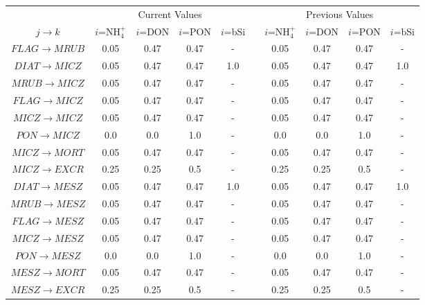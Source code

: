    \small
   \centering
   \begin{tabular}{ccccclcccc}\toprule
      & \multicolumn{4}{c}{Current Values} & \phantom{i} & \multicolumn{4}{c}{Previous Values} \\ \cmidrule{2-5} \cmidrule{7-10}
    $j\rightarrow k$ & $i$=NH$_4^+$ & $i$=DON & $i$=PON & $i$=bSi & & $i$=NH$_4^+$ & $i$=DON & $i$=PON & $i$=bSi \\ \midrule
     $FLAG\rightarrow MRUB$ & 0.05 & 0.47 & 0.47 & - & & 0.05 & 0.47 & 0.47 & - \\
     $DIAT\rightarrow MICZ$ & 0.05 & 0.47 & 0.47 & 1.0 & & 0.05 & 0.47 & 0.47 & 1.0 \\
     $MRUB\rightarrow MICZ$ & 0.05 & 0.47 & 0.47 & - & & 0.05 & 0.47 & 0.47 & - \\
     $FLAG\rightarrow MICZ$ & 0.05 & 0.47 & 0.47 & - & & 0.05 & 0.47 & 0.47 & - \\
     $MICZ\rightarrow MICZ$ & 0.05 & 0.47 & 0.47 & - & & 0.05 & 0.47 & 0.47 & - \\
     $PON\rightarrow MICZ$ & 0.0 & 0.0 & 1.0 & - & & 0.0 & 0.0 & 1.0 & - \\
     $MICZ\rightarrow MORT$ & 0.05 & 0.47 & 0.47 & - & & 0.05 & 0.47 & 0.47 & - \\
     $MICZ\rightarrow EXCR$ & 0.25 & 0.25 & 0.5 & - & & 0.25 & 0.25 & 0.5 & - \\
     $DIAT\rightarrow MESZ$ & 0.05 & 0.47 & 0.47 & 1.0 & & 0.05 & 0.47 & 0.47 & 1.0 \\
     $MRUB\rightarrow MESZ$ & 0.05 & 0.47 & 0.47 & - & & 0.05 & 0.47 & 0.47 & - \\
     $FLAG\rightarrow MESZ$ & 0.05 & 0.47 & 0.47 & - & & 0.05 & 0.47 & 0.47 & - \\
     $MICZ\rightarrow MESZ$ & 0.05 & 0.47 & 0.47 & - & & 0.05 & 0.47 & 0.47 & - \\
     $PON\rightarrow MESZ$ & 0.0 & 0.0 & 1.0 & - & & 0.0 & 0.0 & 1.0 & - \\
     $MESZ\rightarrow MORT$ & 0.05 & 0.47 & 0.47 & - & & 0.05 & 0.47 & 0.47 & - \\
     $MESZ\rightarrow EXCR$ & 0.25 & 0.25 & 0.5 & - & & 0.25 & 0.25 & 0.5 & - \\
   \midrule
   \end{tabular}

